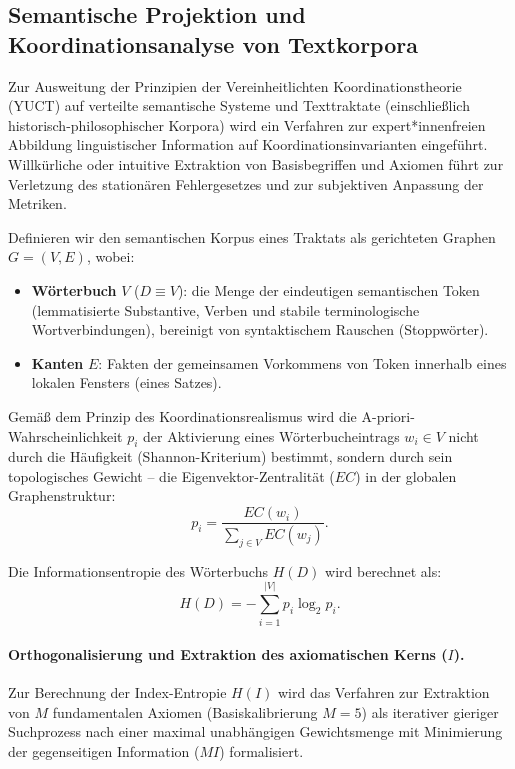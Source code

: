 \documentclass[12pt,a4paper]{article}
\begin{document}
	\subsection{Semantische Projektion und Koordinationsanalyse von Textkorpora}
	\label{subsec:semantic-projection}
	
	Zur Ausweitung der Prinzipien der Vereinheitlichten Koordinationstheorie (YUCT) auf verteilte semantische Systeme und Texttraktate (einschließlich historisch-philosophischer Korpora) wird ein Verfahren zur expert*innenfreien Abbildung linguistischer Information auf Koordinationsinvarianten eingeführt. Willkürliche oder intuitive Extraktion von Basisbegriffen und Axiomen führt zur Verletzung des stationären Fehlergesetzes und zur subjektiven Anpassung der Metriken.
	
	Definieren wir den semantischen Korpus eines Traktats als gerichteten Graphen \(G = (V, E)\), wobei:
	\begin{itemize}
		\item \textbf{Wörterbuch} \(V\) (\(D \equiv V\)): die Menge der eindeutigen semantischen Token (lemmatisierte Substantive, Verben und stabile terminologische Wortverbindungen), bereinigt von syntaktischem Rauschen (Stoppwörter).
		\item \textbf{Kanten} \(E\): Fakten der gemeinsamen Vorkommens von Token innerhalb eines lokalen Fensters (eines Satzes).
	\end{itemize}
	
	Gemäß dem Prinzip des Koordinationsrealismus wird die A-priori-Wahrscheinlichkeit \(p_i\) der Aktivierung eines Wörterbucheintrags \(w_i \in V\) nicht durch die Häufigkeit (Shannon-Kriterium) bestimmt, sondern durch sein topologisches Gewicht – die Eigenvektor-Zentralität (\(EC\)) in der globalen Graphenstruktur:
	\[
	p_{i} = \frac{EC(w_{i})}{\sum_{j \in V} EC(w_{j})}.
	\]
	
	Die Informationsentropie des Wörterbuchs \(H(D)\) wird berechnet als:
	\[
	H(D) = -\sum_{i=1}^{|V|} p_{i} \log_{2} p_{i}.
	\]
	
	\paragraph{Orthogonalisierung und Extraktion des axiomatischen Kerns (\(I\)).}
	Zur Berechnung der Index-Entropie \(H(I)\) wird das Verfahren zur Extraktion von \(M\) fundamentalen Axiomen (Basiskalibrierung \(M = 5\)) als iterativer gieriger Suchprozess nach einer maximal unabhängigen Gewichtsmenge mit Minimierung der gegenseitigen Information (\(MI\)) formalisiert.
	
\end{document}
